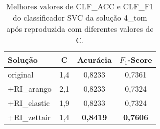 \begin{table}[!thb]
    \centering
    \caption{Melhores valores de CLF\_ACC e CLF\_F1 do classificador SVC da solução 4\_tom após reproduzida com diferentes valores de C.}
    \begin{adjustbox}{max width={\textwidth},keepaspectratio}%
    \begin{tabular}{|l|c|c|c|}
        \hline
        \textbf{Solução}
        & \textbf{C}
        & \textbf{Acurácia}
        & \textbf{$F_1$-Score}
        \\ \hline
        original        
        & 1,4   & 0,8233   & 0,7361 
        \\ \hline
        +RI\_arango
        & 2,1   & 0,8233    & 0,7324          
        \\ \hline
        +RI\_elastic
        & 1,9   & 0,8233    & 0,7324        
        \\ \hline
        +RI\_zettair
        & 1,4   & \textbf{0,8419}    & \textbf{0,7606}          
        \\ 
        \hline
    \end{tabular}
    \end{adjustbox}
    \label{tab:reprodução-4-tom-c} 
\end{table}
